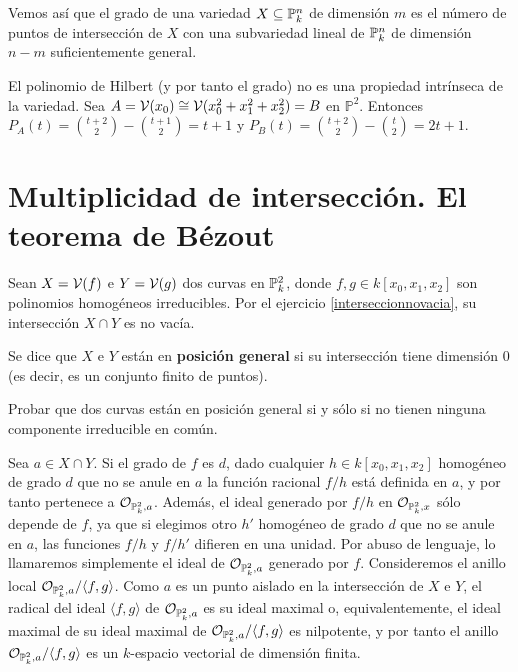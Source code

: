 \documentclass[ACGA.tex]{subfiles}
\begin{document}
Vemos así que el grado de una variedad $X\subseteq\mathbb{P}^n_k$ de dimensión $m$ es el número de puntos de intersección de $X$ con una subvariedad lineal de $\mathbb{P}^n_k$ de dimensión $n-m$ suficientemente general. 

\begin{ejs}
El polinomio de Hilbert (y por tanto el grado) no es una propiedad intrínseca de la variedad. Sea $A=\mathcal{V}(x_0)\cong \mathcal{V}(x_0^2+x_1^2+x_2^2)=B$ en $\mathbb{P}^2$. Entonces $P_A(t)=\binom{t+2}{2}-\binom{t+1}{2}=t+1$ y $P_B(t)=\binom{t+2}{2}-\binom{t}{2}=2t+1$. 
\end{ejs}

\section[Multiplicidad de intersección]{Multiplicidad de intersección. El teorema de Bézout}

                                                                                                                                                                                                                                                                                                                                                                                        Sean $X=\mathcal{V}(f)$ e $Y=\mathcal{V}(g)$ dos curvas en $\mathbb{P}^2_k$, donde $f,g\in k[x_0,x_1,x_2]$ son polinomios homogéneos irreducibles. Por el ejercicio \ref{interseccionnovacia}, su intersección $X\cap Y$ es no vacía. 

\begin{defi}
 Se dice que $X$ e $Y$ están en {\bf posición general} si su intersección tiene dimensión $0$ (es decir, es un conjunto finito de puntos).
\end{defi}

\begin{ejer}
 Probar que dos curvas están en posición general si y sólo si no tienen ninguna componente irreducible en común.
\end{ejer}

Sea $a\in X\cap Y$. Si el grado de $f$ es $d$, dado cualquier $h\in k[x_0,x_1,x_2]$ homogéneo de grado $d$ que no se anule en $a$ la función racional $f/h$ está definida en $a$, y por tanto pertenece a ${\mathcal O}_{\mathbb{P}^2_k,a}$. Además, el ideal generado por $f/h$ en ${\mathcal O}_{\mathbb{P}^2_k,x}$ sólo depende de $f$, ya que si elegimos otro $h'$ homogéneo de grado $d$ que no se anule en $a$, las funciones ${f}/{h}$ y ${f}/{h'}$ difieren en una unidad. Por abuso de lenguaje, lo llamaremos simplemente el ideal de ${\mathcal O}_{\mathbb{P}^2_k,a}$ generado por $f$. Consideremos el anillo local ${\mathcal O}_{\mathbb{P}^2_k,a}/\langle f,g\rangle$. Como $a$ es un punto aislado en la intersección de $X$ e $Y$, el radical del ideal $\langle f,g\rangle$ de ${\mathcal O}_{\mathbb{P}^2_k,a}$ es su ideal maximal o, equivalentemente, el ideal maximal de  su ideal maximal de ${\mathcal O}_{\mathbb{P}^2_k,a}/\langle f,g\rangle$ es nilpotente, y por tanto el anillo ${\mathcal O}_{\mathbb{P}^2_k,a}/\langle f,g\rangle$ es un $k$-espacio vectorial de dimensión finita. 
\end{document}
